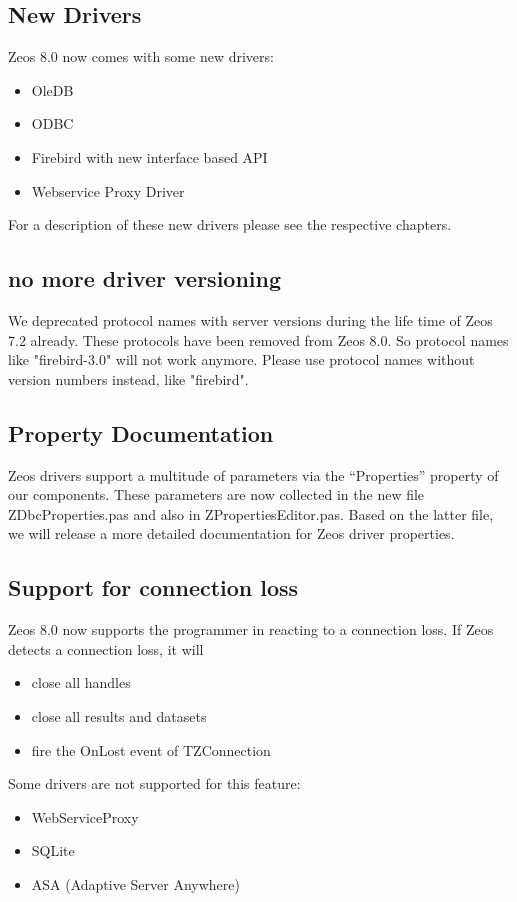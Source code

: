 \documentclass[a4paper,12pt,oneside]{report}
\begin{document}
\subsection{New Drivers}
\label{sec:GeneralChanges_NewDrivers}
Zeos 8.0 now comes with some new drivers:
\begin{itemize}
  \item OleDB
	\item ODBC
	\item Firebird with new interface based API
	\item Webservice Proxy Driver
\end{itemize}
For a description of these new drivers please see the respective chapters.

\subsection{no more driver versioning}
We deprecated protocol names with server versions during the life time of Zeos 7.2 already.
These protocols have been removed from Zeos 8.0.
So protocol names like "firebird-3.0" will not work anymore.
Please use protocol names without version numbers instead, like "firebird".

\subsection{Property Documentation}
Zeos drivers support a multitude of parameters via the "`Properties"' property of our components.
These parameters are now collected in the new file ZDbcProperties.pas and also in ZPropertiesEditor.pas.
Based on the latter file, we will release a more detailed documentation for Zeos driver properties.

\subsection{Support for connection loss}
Zeos 8.0 now supports the programmer in reacting to a connection loss.
If Zeos detects a connection loss, it will
\begin{itemize}
	\item close all handles
	\item close all results and datasets
	\item fire the OnLost event of TZConnection
\end{itemize}

Some drivers are not supported for this feature:
\begin{itemize}
	\item WebServiceProxy
	\item SQLite
	\item ASA (Adaptive Server Anywhere)
\end{itemize}
\end{document}
